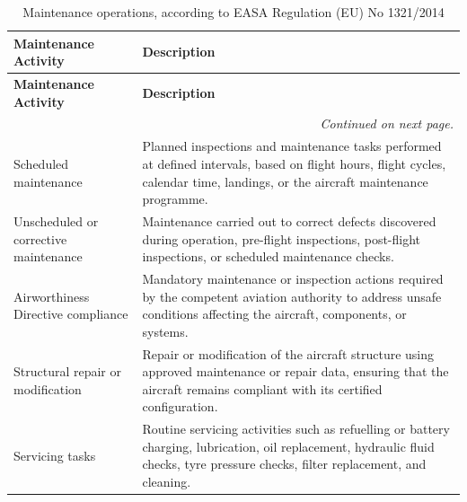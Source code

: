 \begin{longtable}{|p{}| p{}|}
\caption{Maintenance operations, according to EASA Regulation (EU) No 1321/2014 }
\label{maintenance_operation} \\

\hline
\textbf{Maintenance Activity} & \textbf{Description} \\
\hline\hline
\endfirsthead

\hline
\textbf{Maintenance Activity} & \textbf{Description} \\
\hline\hline
\endhead

\hline
\multicolumn{2}{r}{\textit{Continued on next page.}} \\
\endfoot

\hline
\endlastfoot

Scheduled maintenance &
Planned inspections and maintenance tasks performed at defined intervals, based on flight hours, flight cycles, calendar time, landings, or the aircraft maintenance programme. \\
\hline

Unscheduled or corrective maintenance &
Maintenance carried out to correct defects discovered during operation, pre-flight inspections, post-flight inspections, or scheduled maintenance checks. \\
\hline

Airworthiness Directive compliance &
Mandatory maintenance or inspection actions required by the competent aviation authority to address unsafe conditions affecting the aircraft, components, or systems. \\
\hline


Structural repair or modification &
Repair or modification of the aircraft structure using approved maintenance or repair data, ensuring that the aircraft remains compliant with its certified configuration. \\
\hline

Servicing tasks &
Routine servicing activities such as refuelling or battery charging, lubrication, oil replacement, hydraulic fluid checks, tyre pressure checks, filter replacement, and cleaning. \\
\hline


\end{longtable}
